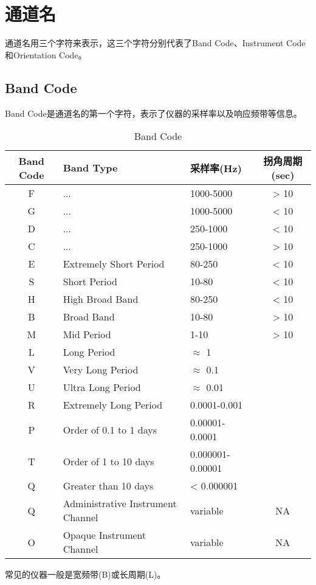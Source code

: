 \section{通道名}
通道名用三个字符来表示，这三个字符分别代表了Band Code、Instrument Code和Orientation Code。

\subsection{Band Code}
Band Code是通道名的第一个字符，表示了仪器的采样率以及响应频带等信息。

\begin{table}[H]
\centering\small
\caption{Band Code}
\label{tbl:bandcode}
\begin{tabular}{cllc}
\toprule
Band Code   &   Band Type   &   采样率(\si{Hz})    & 拐角周期(sec)   \\
\midrule
F           &   ...         &   1000-5000   &     > 10    \\
G           &   ...         &   1000-5000   &     < 10    \\
D           &   ...         &   250-1000    &     < 10    \\
C           &   ...         &   250-1000    &     > 10    \\
E           &   Extremely Short Period  & 80-250    &     < 10    \\
S           &   Short Period          & 10-80   & < 10    \\
H           &   High Broad Band         &   80-250    &   < 10    \\
B           &   Broad Band          &   10-80   & > 10    \\
M           &   Mid Period          &   1-10   & > 10    \\
L           &   Long Period         &   $\approx$ 1   &   \\
V           &   Very  Long Period         & $\approx$ 0.1   &   \\
U           &   Ultra Long Period         & $\approx$ 0.01    &   \\
R           &   Extremely Long Period     & 0.0001-0.001    &   \\
P           &   Order of 0.1 to 1 days   & 0.00001-0.0001    &   \\
T           &   Order of 1 to 10 days    & 0.000001-0.00001    &   \\
Q           &   Greater than 10 days          &     < 0.000001    &   \\
Q           &   Administrative Instrument Channel   & variable    & NA    \\
O           &   Opaque Instrument Channel         & variable    &   NA    \\
\bottomrule
\end{tabular}
\end{table}
常见的仪器一般是宽频带(B)或长周期(L)。

